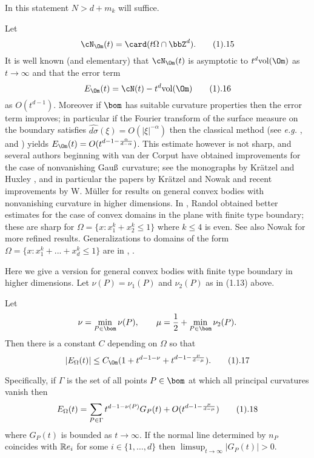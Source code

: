 In this statement  $N>d+m_k$ will suffice.



Let $$\cN_\Om(t)=\card(t\Omega\cap\bbZ^d).
\tag 1.15
$$
It is well known  (and elementary) that $\cN_\Om(t)$ is asymptotic
to $t^d\text{vol}(\Om)$
as $t\to \infty$ and that the error term
$$ 
E_\Om(t)=\cN(t)-t^d\text{vol}(\Om)
\tag 1.16
$$
as $O(t^{d-1})$.
Moreover if $\bom$ has suitable curvature properties then the error term 
improves; in particular if the
Fourier transform of the surface measure on the boundary satisfies
$\widehat {d\sigma}(\xi)=O(|\xi|^{-\alpha})$ then  the classical method
(see  {\it e.g.} \cite{11},
 \cite{13, Theorem 7.7.16} and \cite{24}) yields 
$E_\Om(t)=O(t^{d-1-\frac{\alpha}{d-\alpha}})$.
This estimate however is not sharp, and 
several authors beginning with van der Corput have obtained  
improvements for the case of nonvanishing
 Gau\ss \ curvature; see the monographs by Kr\"atzel \cite{18}
and Huxley \cite{14}, and in  particular 
the papers by  Kr\"atzel and Nowak \cite{20} and recent improvements by
W.  M\"uller \cite{22}
for results on general convex bodies with nonvanishing curvature
 in higher dimensions.
In \cite{24, I}, \cite{25} Randol  obtained better estimates for the case 
of convex domains in the plane with  finite type boundary;
these are sharp for 
$\Omega=\{ x:x_1^k+x_2^k\le 1\}$ where $k\le 4$ is even. See also 
Nowak \cite{23} for more refined results.
Generalizations to domains of the form 
$\Omega=\{ x:x_1^k+...+x_d^k\le 1\}$ are in \cite{24, II}, \cite{19}.


Here we give a version for general convex bodies with finite type boundary
in higher dimensions. Let $\nu(P)=\nu_1(P)$ and  $\nu_2(P)$ as in (1.13) above.



Let $$\nu=\min_{P\in\bom} \nu(P), \qquad 
\mu= \frac 1 2+ \min_{P\in  \bom} \nu_2(P).$$
Then there is a constant $C$ depending on $\Omega$ so that
$$
|E_\Omega(t) |\le C_\Om (1+ t^{d-1-\nu}+ t^{d-1-\frac{\mu}{d-\mu}}).
\tag 1.17
$$

Specifically, if $\Gamma$ is the set of all points $P\in \bom$ 
at which all principal curvatures vanish then
$$
E_\Omega(t)= \sum_{P\in \Gamma} t^{d-1-\nu(P)} G_P(t) + 
O(t^{d-1-\frac{\mu}{d-\mu}})
\tag 1.18
$$
where $G_P(t)$ is bounded as $t\to\infty$.
If the normal line determined by $n_P$ coincides with
$\Bbb Re_i$ for some $i\in\{1,\dots, d\} $ then  
$\limsup_{t\to \infty} |G_P(t)|>0$.
%
\endproclaim

